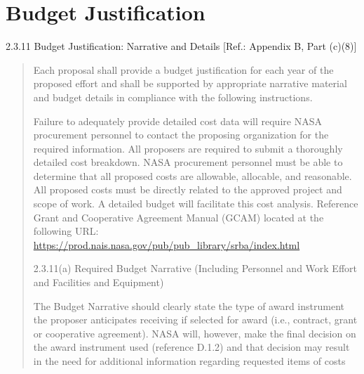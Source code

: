 \documentclass[12pt]{article}
\begin{document}

\cleardoublepage

\section*{Budget Justification}
2.3.11 Budget Justification: Narrative and Details [Ref.: Appendix B, Part (c)(8)]

\begin{quote}
Each proposal shall provide a budget justification for each year of
the proposed effort and shall be supported by appropriate narrative
material and budget details in compliance with the following
instructions.

Failure to adequately provide detailed cost data will require NASA
procurement personnel to contact the proposing organization for the
required information. All proposers are required to submit a
thoroughly detailed cost breakdown. NASA procurement personnel must be
able to determine that all proposed costs are allowable, allocable,
and reasonable. All proposed costs must be directly related to the
approved project and scope of work. A detailed budget will facilitate
this cost analysis. Reference Grant and Cooperative Agreement Manual
(GCAM) located at the following URL:
\url{https://prod.nais.nasa.gov/pub/pub_library/srba/index.html}

2.3.11(a) Required Budget Narrative (Including Personnel and Work
Effort and Facilities and Equipment)

The Budget Narrative should clearly state the type of award instrument
the proposer anticipates receiving if selected for award (i.e.,
contract, grant or cooperative agreement). NASA will, however, make
the final decision on the award instrument used (reference D.1.2) and
that decision may result in the need for additional information
regarding requested items of costs


\end{quote}
\end{document}
